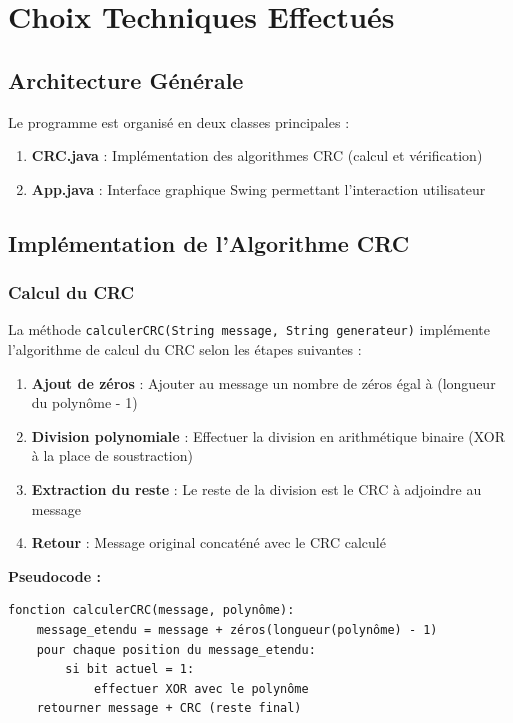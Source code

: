 \documentclass[12pt, a4paper]{article}
\begin{document}
\section{Choix Techniques Effectués}

\subsection{Architecture Générale}

Le programme est organisé en deux classes principales :

\begin{enumerate}
    \item \textbf{CRC.java} : Implémentation des algorithmes CRC (calcul et vérification)
    \item \textbf{App.java} : Interface graphique Swing permettant l'interaction utilisateur
\end{enumerate}

\subsection{Implémentation de l'Algorithme CRC}

\subsubsection{Calcul du CRC}

La méthode \texttt{calculerCRC(String message, String generateur)} implémente l'algorithme de calcul du CRC selon les étapes suivantes :

\begin{enumerate}
    \item \textbf{Ajout de zéros} : Ajouter au message un nombre de zéros égal à (longueur du polynôme - 1)
    \item \textbf{Division polynomiale} : Effectuer la division en arithmétique binaire (XOR à la place de soustraction)
    \item \textbf{Extraction du reste} : Le reste de la division est le CRC à adjoindre au message
    \item \textbf{Retour} : Message original concaténé avec le CRC calculé
\end{enumerate}

\textbf{Pseudocode :}
\begin{verbatim}
fonction calculerCRC(message, polynôme):
    message_etendu = message + zéros(longueur(polynôme) - 1)
    pour chaque position du message_etendu:
        si bit actuel = 1:
            effectuer XOR avec le polynôme
    retourner message + CRC (reste final)
\end{verbatim}
\end{document}
